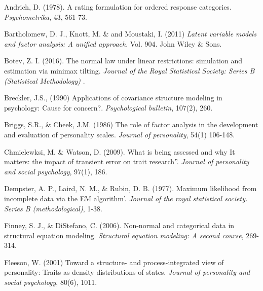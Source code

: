 \documentclass[12pt]{article}
\begin{document}

\begin{thebibliography}{99}

 Andrich, D. (1978). A rating formulation for ordered response categories. \textit{Psychometrika}, 43, 561-73.

 Bartholomew, D. J., Knott, M. \& and Moustaki, I. (2011) \textit{Latent variable models and factor analysis: A unified approach}. Vol. 904. John Wiley \& Sons.

  Botev, Z. I. (2016).  The normal law under linear
restrictions: simulation and estimation via minimax tilting.  \textit{%
Journal of the Royal Statistical Society: Series B (Statistical Methodology)}%
.

  Breckler, J.S., (1990)  Applications of covariance
structure modeling in psychology: Cause for concern?.  \textit{Psychological
bulletin}, 107(2), 260.

  Briggs, S.R., \& Cheek, J.M. (1986)  The role of factor
analysis in the development and evaluation of personality scales.  \textit{%
Journal of personality}, 54(1) 106-148.

  Chmielewksi, M. \& Watson, D. (2009).  What is
being assessed and why It matters: the impact of transient error on trait
research''.  \textit{Journal of personality and social psychology}, 97(1),
186.

  Dempster, A. P., Laird, N. M., \& Rubin, D. B. (1977).
Maximum likelihood from incomplete data via the EM algorithm'.  \textit{%
Journal of the royal statistical society. Series B (methodological)}, 1-38.

  Finney, S. J., \& DiStefano, C. (2006).  Non-normal and
categorical data in structural equation modeling.  \textit{Structural
equation modeling: A second course}, 269-314.

  Fleeson, W. (2001)  Toward a structure- and
process-integrated view of personality: Traits as density distributions of
states.  \textit{Journal of personality and social psychology}, 80(6), 1011.


\end{thebibliography}
\end{document}
